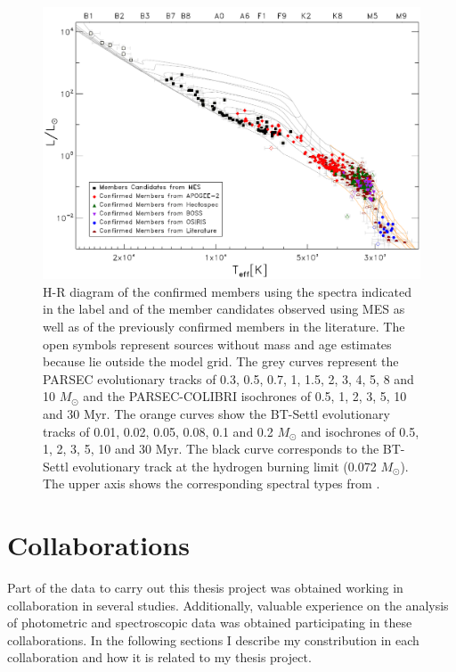 \documentclass[12pt]{article}
\begin{document}
\begin{figure}[ht!]
	\includegraphics[width=1.0\textwidth]{HR_25Ori.pdf}
	\caption[H-R diagram of all the so far confirmed members in this work and of the member candidates to high/intermediate mass stars.]{H-R diagram of the confirmed members using the spectra indicated in the label and of the member candidates observed using MES as well as of the previously confirmed members in the literature. The open symbols represent sources without mass and age estimates because lie outside the model grid. The grey curves represent the PARSEC evolutionary tracks of 0.3, 0.5, 0.7, 1, 1.5, 2, 3, 4, 5, 8 and 10 $M_\odot$ and the PARSEC-COLIBRI isochrones of 0.5, 1, 2, 3, 5, 10 and 30 Myr. The orange curves show the BT-Settl evolutionary tracks of 0.01, 0.02, 0.05, 0.08, 0.1 and 0.2 $M_\odot$ and isochrones of 0.5, 1, 2, 3, 5, 10 and 30 Myr. The black curve corresponds to the BT-Settl evolutionary track at the hydrogen burning limit (0.072 $M_\odot$). The upper axis shows the corresponding spectral types from \citet{Pecaut2013}.}
	\label{fig:HR_all}
\end{figure}

\section{Collaborations}
\label{sec:collaborations}
Part of the data to carry out this thesis project was obtained working in collaboration in several studies. Additionally, valuable experience on the analysis of photometric and spectroscopic data was obtained participating in these collaborations. In the following sections I describe my constribution in each collaboration and how it is related to my thesis project.
\end{document}
